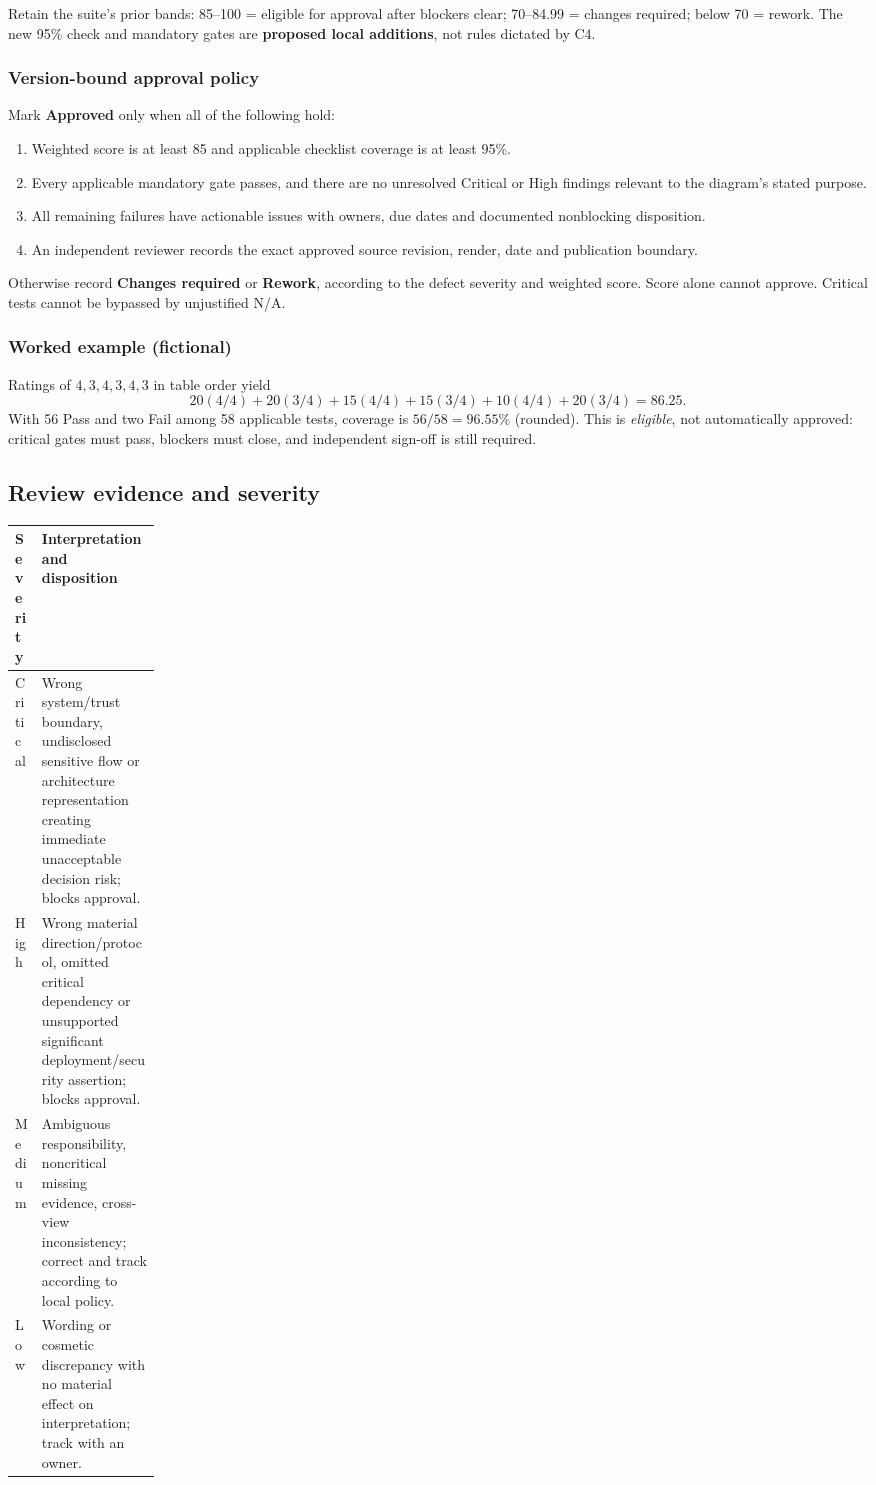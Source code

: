 \documentclass[10pt,letterpaper]{article}
\begin{document}
Retain the suite's prior bands: 85--100 = eligible for approval after blockers clear; 70--84.99 = changes required; below 70 = rework. The new 95\% check and mandatory gates are \textbf{proposed local additions}, not rules dictated by C4.

\subsubsection{Version-bound approval policy}
Mark \textbf{Approved} only when all of the following hold:
\begin{enumerate}
\item Weighted score is at least 85 and applicable checklist coverage is at least 95\%.
\item Every applicable mandatory gate passes, and there are no unresolved Critical or High findings relevant to the diagram's stated purpose.
\item All remaining failures have actionable issues with owners, due dates and documented nonblocking disposition.
\item An independent reviewer records the exact approved source revision, render, date and publication boundary.
\end{enumerate}
Otherwise record \textbf{Changes required} or \textbf{Rework}, according to the defect severity and weighted score. Score alone cannot approve. Critical tests cannot be bypassed by unjustified N/A.

\subsubsection{Worked example (fictional)}
Ratings of \(4,3,4,3,4,3\) in table order yield
\[
20(4/4)+20(3/4)+15(4/4)+15(3/4)+10(4/4)+20(3/4)
=\boxed{86.25}.
\]
With 56 Pass and two Fail among 58 applicable tests, coverage is \(56/58=96.55\%\) (rounded). This is \emph{eligible}, not automatically approved: critical gates must pass, blockers must close, and independent sign-off is still required.

\subsection{Review evidence and severity}
\begin{tabularx}{\linewidth}{@{}>{\raggedright\arraybackslash}p{0.17\linewidth}Y@{}}
\toprule\textbf{Severity} & \textbf{Interpretation and disposition}\\\midrule
Critical & Wrong system/trust boundary, undisclosed sensitive flow or architecture representation creating immediate unacceptable decision risk; blocks approval.\\
High & Wrong material direction/protocol, omitted critical dependency or unsupported significant deployment/security assertion; blocks approval.\\
Medium & Ambiguous responsibility, noncritical missing evidence, cross-view inconsistency; correct and track according to local policy.\\
Low & Wording or cosmetic discrepancy with no material effect on interpretation; track with an owner.\\
\bottomrule
\end{tabularx}
\end{document}
